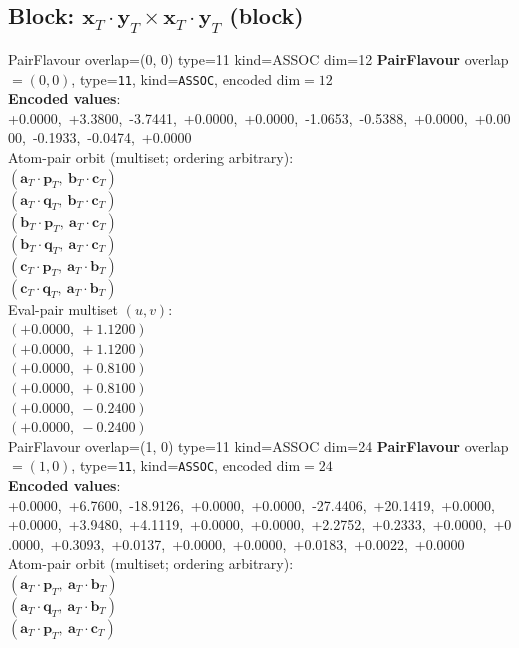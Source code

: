 \documentclass[a4paper,11pt]{article}
\newcommand{\fpbeomcfokjooi}[2]{\mathbf{#1}_T \cdot \mathbf{#2}_T}
\begin{document}
\subsection{Block: $\fpbeomcfokjooi{x}{y} \times \fpbeomcfokjooi{x}{y}$  (block)}
    PairFlavour  overlap=(0, 0)  type=11  kind=ASSOC  dim=12
\textbf{PairFlavour} overlap$=(0, 0)$, type=\texttt{11}, kind=\texttt{ASSOC}, encoded dim$=12$\\
\textbf{      Encoded values}: +0.0000,\ +3.3800,\ -3.7441,\ +0.0000,\ +0.0000,\ -1.0653,\ -0.5388,\ +0.0000,\ +0.0000,\ -0.1933,\ -0.0474,\ +0.0000\\
\quad Atom-pair orbit (multiset; ordering arbitrary):\\
$(\fpbeomcfokjooi{a}{p},\ \fpbeomcfokjooi{b}{c})$\\
$(\fpbeomcfokjooi{a}{q},\ \fpbeomcfokjooi{b}{c})$\\
$(\fpbeomcfokjooi{b}{p},\ \fpbeomcfokjooi{a}{c})$\\
$(\fpbeomcfokjooi{b}{q},\ \fpbeomcfokjooi{a}{c})$\\
$(\fpbeomcfokjooi{c}{p},\ \fpbeomcfokjooi{a}{b})$\\
$(\fpbeomcfokjooi{c}{q},\ \fpbeomcfokjooi{a}{b})$\\
\quad Eval-pair multiset $(u, v)$:\\
$(+0.0000,\ +1.1200)$\\
$(+0.0000,\ +1.1200)$\\
$(+0.0000,\ +0.8100)$\\
$(+0.0000,\ +0.8100)$\\
$(+0.0000,\ -0.2400)$\\
$(+0.0000,\ -0.2400)$\\
    PairFlavour  overlap=(1, 0)  type=11  kind=ASSOC  dim=24
\textbf{PairFlavour} overlap$=(1, 0)$, type=\texttt{11}, kind=\texttt{ASSOC}, encoded dim$=24$\\
\textbf{      Encoded values}: +0.0000,\ +6.7600,\ -18.9126,\ +0.0000,\ +0.0000,\ -27.4406,\ +20.1419,\ +0.0000,\ +0.0000,\ +3.9480,\ +4.1119,\ +0.0000,\ +0.0000,\ +2.2752,\ +0.2333,\ +0.0000,\ +0.0000,\ +0.3093,\ +0.0137,\ +0.0000,\ +0.0000,\ +0.0183,\ +0.0022,\ +0.0000\\
\quad Atom-pair orbit (multiset; ordering arbitrary):\\
$(\fpbeomcfokjooi{a}{p},\ \fpbeomcfokjooi{a}{b})$\\
$(\fpbeomcfokjooi{a}{q},\ \fpbeomcfokjooi{a}{b})$\\
$(\fpbeomcfokjooi{a}{p},\ \fpbeomcfokjooi{a}{c})$\\
\end{document}
